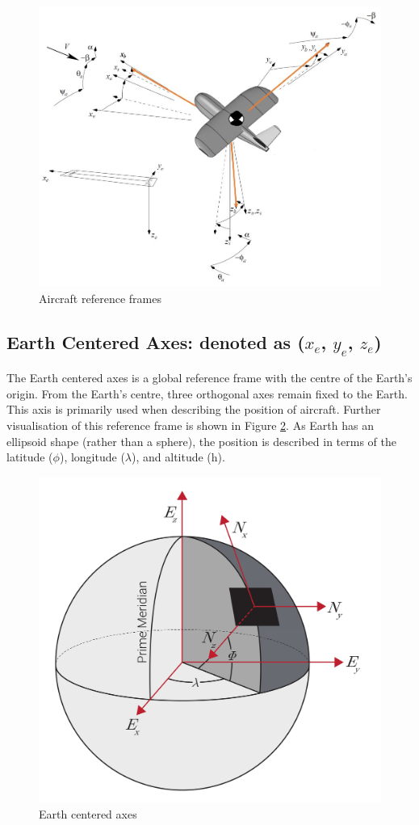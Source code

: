 \begin{figure}[H]
  \centering
  \includegraphics[width=0.9\linewidth]{03_LiteratureReview/Figs/referenceFrame.JPG}
  \caption{Aircraft reference frames }
  \label{fig:refernce}
\end{figure}

\subsection{Earth Centered Axes: denoted as \texorpdfstring{($x_e$, $y_e$, $z_e$)}{L}}
The Earth centered axes is a global reference frame with the centre of the Earth's origin. From the Earth's centre, three orthogonal axes remain fixed to the Earth. This axis is primarily used when describing the position of aircraft. Further visualisation of this reference frame is shown in Figure \ref{fig:refernceEarth}. As Earth has an ellipsoid shape (rather than a sphere), the position is described in terms of the latitude ($\phi$), longitude ($\lambda$), and altitude (h).

\begin{figure}[H]
  \centering
  \includegraphics[width=0.6\linewidth]{03_LiteratureReview/Figs/ref_ecef.jpg}
  \caption{Earth centered axes \cite{VectorNAV}}
  \label{fig:refernceEarth}
\end{figure}

